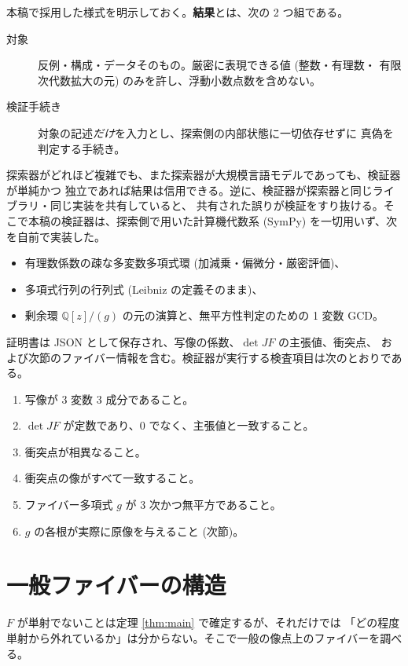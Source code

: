 \documentclass[paper=a4,fontsize=10.5pt,jafontsize=10.5pt]{jlreq}
\theoremstyle{plain}
\theoremstyle{definition}
\begin{document}
本稿で採用した様式を明示しておく。\textbf{結果}とは、次の 2 つ組である。

\begin{description}
\item[対象] 反例・構成・データそのもの。厳密に表現できる値 (整数・有理数・
  有限次代数拡大の元) のみを許し、浮動小数点数を含めない。
\item[検証手続き] 対象の記述\textit{だけ}を入力とし、探索側の内部状態に一切依存せずに
  真偽を判定する手続き。
\end{description}

探索器がどれほど複雑でも、また探索器が大規模言語モデルであっても、検証器が単純かつ
独立であれば結果は信用できる。逆に、検証器が探索器と同じライブラリ・同じ実装を共有していると、
共有された誤りが検証をすり抜ける。そこで本稿の検証器は、探索側で用いた計算機代数系
(SymPy) を一切用いず、次を自前で実装した。

\begin{itemize}
\item 有理数係数の疎な多変数多項式環 (加減乗・偏微分・厳密評価)、
\item 多項式行列の行列式 (Leibniz の定義そのまま)、
\item 剰余環 $\mathbb{Q}[z]/(g)$ の元の演算と、無平方性判定のための 1 変数 GCD。
\end{itemize}

証明書は JSON として保存され、写像の係数、$\det JF$ の主張値、衝突点、
および次節のファイバー情報を含む。検証器が実行する検査項目は次のとおりである。

\begin{enumerate}
\item 写像が 3 変数 3 成分であること。
\item $\det JF$ が定数であり、$0$ でなく、主張値と一致すること。
\item 衝突点が相異なること。
\item 衝突点の像がすべて一致すること。
\item ファイバー多項式 $g$ が 3 次かつ無平方であること。
\item $g$ の各根が実際に原像を与えること (次節)。
\end{enumerate}

\section{一般ファイバーの構造}

$F$ が単射でないことは定理 \ref{thm:main} で確定するが、それだけでは
「どの程度単射から外れているか」は分からない。そこで一般の像点上のファイバーを調べる。
\end{document}
